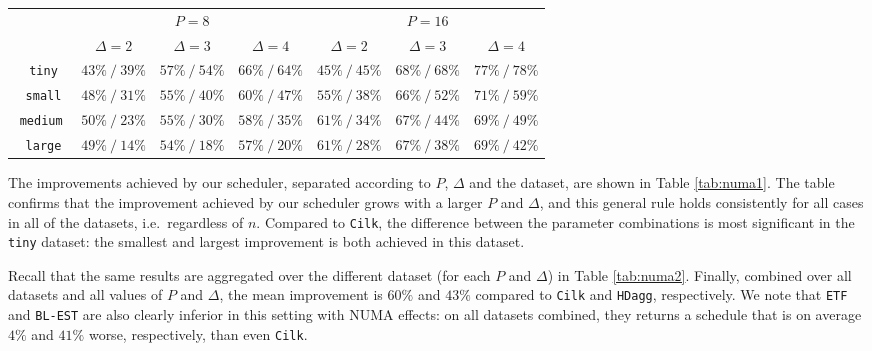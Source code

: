 \documentclass[sigconf,nonacm]{acmart}
\begin{document}
\begin{table*}[t]
    \centering
      \caption{Improvement achieved by our scheduler (with NUMA) for each combination of $P$, $\Delta$ and dataset, with respect to \texttt{Cilk} (first number) and \texttt{HDagg} (second number), for a fixed choice of $g=1$ (and $\ell=5$).}
    \renewcommand{\arraystretch}{1.55}
    \begin{tabular}{c || c | c | c | c | c | c | }
     & \multicolumn{3}{c}{$P=8$} & \multicolumn{3}{c}{$P=16$} \\ [0.5ex]
     & $\Delta=2$ & $\Delta=3$ & $\Delta=4$ & $\Delta=2$ & $\Delta=3$ & $\Delta=4$ \\ [0.5ex] 
     \hline\hline
     $\!$ \texttt{tiny}  & $43\% \: / \: 39\%$ & $57\% \: / \: 54\%$ & $66\% \: / \: 64\%$ & $45\% \: / \: 45\%$  & $68\% \: / \: 68\%$ & $77\% \: / \: 78\%$ \\ 
     \hline
     $\!$ \texttt{small} & $48\% \: / \: 31\%$ & $55\% \: / \: 40\%$ & $60\% \: / \: 47\%$ & $55\% \: / \: 38\%$  & $66\% \: / \: 52\%$ & $71\% \: / \: 59\%$ \\
     \hline
     $\!\!$ \texttt{medium} $\!$ & $50\% \: / \: 23\%$ & $55\% \: / \: 30\%$ & $58\% \: / \: 35\%$ & $61\% \: / \: 34\%$  & $67\% \: / \: 44\%$ & $69\% \: / \: 49\%$ \\
     \hline
     $\!$ \texttt{large} & $49\% \: / \: 14\%$ & $54\% \: / \: 18\%$ & $57\% \: / \: 20\%$ & $61\% \: / \: 28\%$  & $67\% \: / \: 38\%$ & $69\% \: / \: 42\%$ \\
     \hline
    \end{tabular}
  \label{tab:numa1}
\end{table*}

The improvements achieved by our scheduler, separated according to $P$, $\Delta$ and the dataset, are shown in Table \ref{tab:numa1}. The table confirms that the improvement achieved by our scheduler grows with a larger $P$ and $\Delta$, and this general rule holds consistently for all cases in all of the datasets, i.e.\ regardless of $n$. Compared to \texttt{Cilk}, the difference between the parameter combinations is most significant in the \texttt{tiny} dataset: the smallest and largest improvement is both achieved in this dataset.

Recall that the same results are aggregated over the different dataset (for each $P$ and $\Delta$) in Table \ref{tab:numa2}. Finally, combined over all datasets and all values of $P$ and $\Delta$, the mean improvement is $60\%$ and $43\%$ compared to \texttt{Cilk} and \texttt{HDagg}, respectively. We note that \texttt{ETF} and \texttt{BL-EST} are also clearly inferior in this setting with NUMA effects: on all datasets combined, they returns a schedule that is on average $4\%$ and $41\%$ worse, respectively, than even \texttt{Cilk}.
\end{document}
